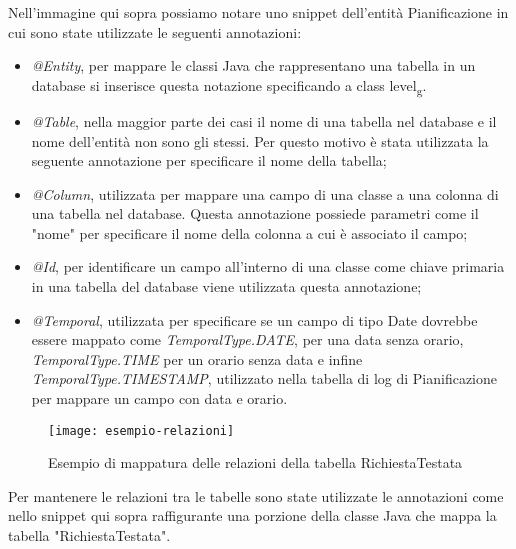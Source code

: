 \noindent Nell'immagine qui sopra possiamo notare uno snippet dell'entità Pianificazione in cui sono state utilizzate le seguenti annotazioni:
\begin{itemize}
\item \textit{@Entity}, per mappare le classi Java che rappresentano una tabella in un database si inserisce questa notazione specificando a class level\textsubscript{g}.
\item \textit{@Table}, nella maggior parte dei casi il nome di una tabella nel database e il nome dell'entità non sono gli stessi. Per questo motivo è stata utilizzata la seguente annotazione per specificare il nome della tabella;
\item \textit{@Column}, utilizzata per mappare una campo di una classe a una colonna di una tabella nel database. Questa annotazione possiede parametri come il "nome" per specificare il nome della colonna a cui è associato il campo;
\item \textit{@Id}, per identificare un campo all'interno di una classe come chiave primaria in una tabella del database viene utilizzata questa annotazione;
\item \textit{@Temporal}, utilizzata per specificare se un campo di tipo Date dovrebbe essere mappato come \textit{TemporalType.DATE}, per una data senza orario, \textit{TemporalType.TIME} per un orario senza data e infine \textit{TemporalType.TIMESTAMP}, utilizzato nella tabella di log di Pianificazione per mappare un campo con data e orario.
\end{itemize}

\begin{figure}[H] 
    \centering 
    \texttt{[image: esempio-relazioni]} 
    \caption{Esempio di mappatura delle relazioni della tabella RichiestaTestata}
\end{figure}
\noindent Per mantenere le relazioni tra le tabelle sono state utilizzate le annotazioni come nello snippet qui sopra raffigurante una porzione della classe Java che mappa la tabella "RichiestaTestata".
